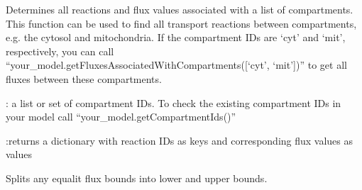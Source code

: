 \documentclass[letterpaper,12pt,english]{sphinxmanual}
\begin{document}
\begin{fulllineitems}
\begin{fulllineitems}
\begin{quote}
\begin{description}
\end{description}\end{quote}

\end{fulllineitems}


\begin{fulllineitems}
\label{\detokenize{api/core:cbmpy.CBModel.Model.getFluxesAssociatedWithCompartments}}
\pysigstartsignatures
\pysiglinewithargsret
{}
{}
{}
\pysigstopsignatures
\sphinxAtStartPar
Determines all reactions and flux values associated with a list of
compartments. This function can be used to find all transport reactions between
compartments, e.g. the cytosol and mitochondria. If the compartment IDs are
‘cyt’ and ‘mit’, respectively, you can call
“your\_model.getFluxesAssociatedWithCompartments({[}‘cyt’, ‘mit’{]})” to get all
fluxes between these compartments.

\sphinxAtStartPar
{}: a list or set of compartment IDs.                 To check the
existing compartment IDs in your model                 call
“your\_model.getCompartmentIds()”

\sphinxAtStartPar
:returns a dictionary with reaction IDs as keys and corresponding flux values as
values

\end{fulllineitems}


\begin{fulllineitems}
\label{\detokenize{api/core:cbmpy.CBModel.Model.splitEqualityFluxBounds}}
\pysigstartsignatures
\pysiglinewithargsret
{}
{}
{}
\pysigstopsignatures
\sphinxAtStartPar
Splits any equalit flux bounds into lower and upper bounds.

\end{fulllineitems}



\end{fulllineitems}
\end{document}

